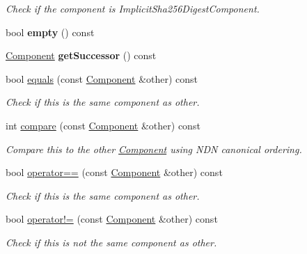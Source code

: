 \begin{DoxyCompactItemize}
\begin{DoxyCompactList}\small\item\em Check if the component is Implicit\+Sha256\+Digest\+Component. \end{DoxyCompactList}\item 
bool {\bfseries empty} () const\hypertarget{classndn_1_1name_1_1Component_a484b6b6063e6f99db3cd3e1b46691539}{}\label{classndn_1_1name_1_1Component_a484b6b6063e6f99db3cd3e1b46691539}

\item 
\hyperlink{classndn_1_1name_1_1Component}{Component} {\bfseries get\+Successor} () const\hypertarget{classndn_1_1name_1_1Component_a14ae58a3b633a46d475c602034772f52}{}\label{classndn_1_1name_1_1Component_a14ae58a3b633a46d475c602034772f52}

\item 
bool \hyperlink{classndn_1_1name_1_1Component_ad44312885a279b5790052f930a491cce}{equals} (const \hyperlink{classndn_1_1name_1_1Component}{Component} \&other) const
\begin{DoxyCompactList}\small\item\em Check if this is the same component as other. \end{DoxyCompactList}\item 
int \hyperlink{classndn_1_1name_1_1Component_aeb8e560119f3270bc8db6780f0cb34db}{compare} (const \hyperlink{classndn_1_1name_1_1Component}{Component} \&other) const
\begin{DoxyCompactList}\small\item\em Compare this to the other \hyperlink{classndn_1_1name_1_1Component}{Component} using N\+DN canonical ordering. \end{DoxyCompactList}\item 
bool \hyperlink{classndn_1_1name_1_1Component_af6952bbb7b759494c85f3977218ae802}{operator==} (const \hyperlink{classndn_1_1name_1_1Component}{Component} \&other) const
\begin{DoxyCompactList}\small\item\em Check if this is the same component as other. \end{DoxyCompactList}\item 
bool \hyperlink{classndn_1_1name_1_1Component_ac4952f9299f1d62b5ec26612c5dc8699}{operator!=} (const \hyperlink{classndn_1_1name_1_1Component}{Component} \&other) const
\begin{DoxyCompactList}\small\item\em Check if this is not the same component as other. \end{DoxyCompactList}\item 

\end{DoxyCompactItemize}
